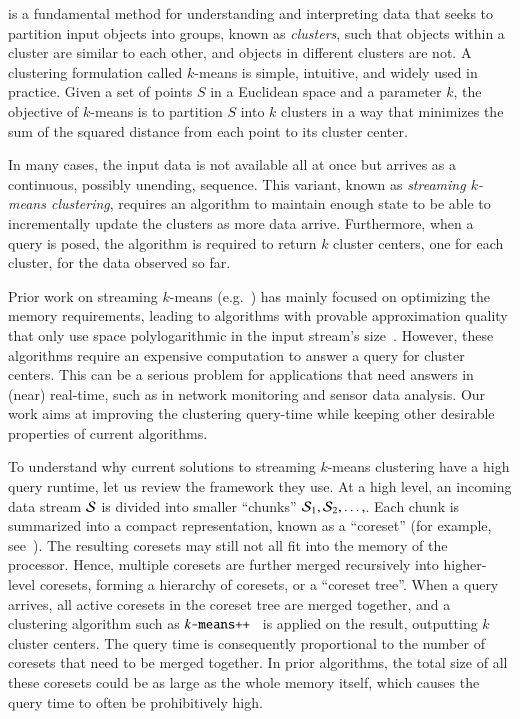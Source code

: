  is a fundamental method for understanding and interpreting data that
seeks to partition input objects into groups, known as \emph{clusters}, such
that objects within a cluster are similar to each other, and objects in
different clusters are not.  A clustering formulation called $k$-means is
simple, intuitive, and widely used in practice.  Given a set of points $S$ in a
Euclidean space and a parameter $k$, the objective of $k$-means is to partition
$S$ into $k$ clusters in a way that minimizes the sum of the squared distance
from each point to its cluster center.

In many cases, the input data is not available all at once but arrives as a
continuous, possibly unending, sequence.  This variant, known as \emph{streaming
$k$-means clustering}, requires an algorithm to maintain enough state to be
able to incrementally update the clusters as more data arrive.  Furthermore,
when a query is posed, the algorithm is required to return $k$ cluster centers,
one for each cluster, for the data observed so far.

Prior work on streaming $k$-means (e.g.~\cite{AMR+12,AJM09,GMM+03,SWM11}) has
mainly focused on optimizing the memory requirements, leading to algorithms with
provable approximation quality that only use space polylogarithmic in the input
stream's size~\cite{AMR+12,AJM09}.  However, these algorithms require an
expensive computation to answer a query for cluster centers.  This can be a
serious problem for applications that need answers in (near) real-time, such as
in network monitoring and sensor data analysis.  Our work aims at improving the
clustering query-time while keeping other desirable properties of current
algorithms.

To understand why current solutions to streaming $k$-means clustering have a high query runtime, let us review the
framework they use. At a high level, an incoming data stream $\stream$ is divided into smaller ``chunks''
$\stream_1,\stream_2,\ldots,$. Each chunk is summarized into a compact
representation, known as a ``coreset'' (for example, see~\cite{HM04}). The
resulting coresets may still not all fit into the memory of the processor.
Hence, multiple coresets are further merged recursively into higher-level
coresets, forming a hierarchy of coresets, or a ``coreset tree''.  When a query
arrives, all active coresets in the coreset tree are merged together, and a
clustering algorithm such as $\texttt{$k$-means++}$~\cite{AV07} is applied on the result,
outputting $k$ cluster centers. The query time is consequently proportional to
the number of coresets that need to be merged together. In prior algorithms, the
total size of all these coresets could be as large as the whole memory itself,
which causes the query time to often be prohibitively high.


